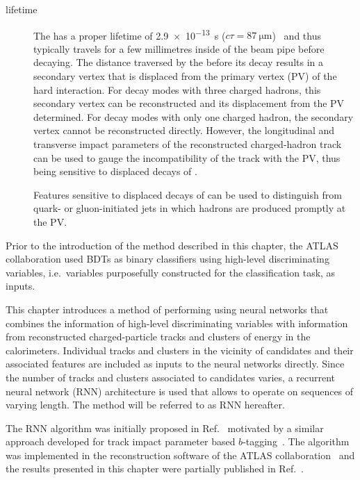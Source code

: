 \begin{description}
\item[\taulepton lifetime] The \taulepton has a proper lifetime of
  \SI{2.9e-13}{\second}
  ($c \tau = \SI{87}{\micro\metre}$)~\cite{pdg2020} and thus typically
  travels for a few millimetres inside of the beam pipe before
  decaying. The distance traversed by the \taulepton before its decay
  results in a secondary vertex that is displaced from the primary
  vertex (PV) of the hard interaction. For \taulepton decay modes with
  three charged hadrons, this secondary vertex can be reconstructed
  and its displacement from the PV determined. For decay modes with
  only one charged hadron, the secondary vertex cannot be
  reconstructed directly. However, the longitudinal and transverse
  impact parameters of the reconstructed charged-hadron track can be
  used to gauge the incompatibility of the track with the PV, thus
  being sensitive to displaced decays of \tauleptons.

  Features sensitive to displaced decays of \tauleptons can be used to
  distinguish \tauhad from quark- or gluon-initiated jets in which
  hadrons are produced promptly at the PV.

\end{description}
Prior to the introduction of the method described in this chapter, the
ATLAS collaboration used BDTs as binary classifiers using high-level
discriminating variables, i.e.\ variables purposefully constructed for
the classification task, as inputs.

This chapter introduces a method of performing \tauid using neural
networks that combines the information of high-level discriminating
variables with information from reconstructed charged-particle tracks
and clusters of energy in the calorimeters. Individual tracks and
clusters in the vicinity of \tauhadvis candidates and their associated
features are included as inputs to the neural networks directly. Since
the number of tracks and clusters associated to \tauhadvis candidates
varies, a recurrent neural network (RNN) architecture is used that
allows to operate on sequences of varying length. The method will be
referred to as RNN \tauid hereafter.

The RNN \tauid algorithm was initially proposed in
Ref.~\cite{cdeutsch-master} motivated by a similar approach developed
for track impact parameter based
$b$-tagging~\cite{ATL-PHYS-PUB-2017-003}. The algorithm was
implemented in the reconstruction software of the ATLAS
collaboration~\cite{ATL-SOFT-PUB-2021-001} and the results presented
in this chapter were partially published in
Ref.~\cite{ATL-PHYS-PUB-2019-033}. %

